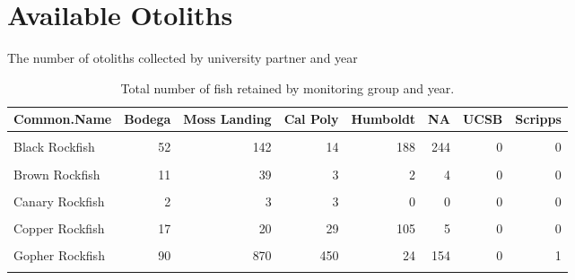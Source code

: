 \documentclass[
]{article}
\begin{document}
\hypertarget{available-otoliths}{%
\section{Available Otoliths}\label{available-otoliths}}

The number of otoliths collected by university partner and year

\FloatBarrier

\begin{table}

\caption{\label{tab:otoliths}Total number of fish retained by monitoring group and year.}
\centering
\begin{tabular}[t]{lrrrrrrr}
\toprule
Common.Name & Bodega & Moss Landing & Cal Poly & Humboldt & NA & UCSB & Scripps\\
\midrule
\cellcolor{gray!6}{Black-and-Yellow Rockfish} & \cellcolor{gray!6}{4} & \cellcolor{gray!6}{6} & \cellcolor{gray!6}{15} & \cellcolor{gray!6}{0} & \cellcolor{gray!6}{0} & \cellcolor{gray!6}{0} & \cellcolor{gray!6}{0}\\
Black Rockfish & 52 & 142 & 14 & 188 & 244 & 0 & 0\\
\cellcolor{gray!6}{Blue Rockfish} & \cellcolor{gray!6}{54} & \cellcolor{gray!6}{316} & \cellcolor{gray!6}{183} & \cellcolor{gray!6}{161} & \cellcolor{gray!6}{69} & \cellcolor{gray!6}{1} & \cellcolor{gray!6}{0}\\
Brown Rockfish & 11 & 39 & 3 & 2 & 4 & 0 & 0\\
\cellcolor{gray!6}{California Scorpionfish} & \cellcolor{gray!6}{0} & \cellcolor{gray!6}{0} & \cellcolor{gray!6}{0} & \cellcolor{gray!6}{0} & \cellcolor{gray!6}{0} & \cellcolor{gray!6}{0} & \cellcolor{gray!6}{1}\\
\addlinespace
Canary Rockfish & 2 & 3 & 3 & 0 & 0 & 0 & 0\\
\cellcolor{gray!6}{China Rockfish} & \cellcolor{gray!6}{48} & \cellcolor{gray!6}{38} & \cellcolor{gray!6}{3} & \cellcolor{gray!6}{70} & \cellcolor{gray!6}{31} & \cellcolor{gray!6}{0} & \cellcolor{gray!6}{0}\\
Copper Rockfish & 17 & 20 & 29 & 105 & 5 & 0 & 0\\
\cellcolor{gray!6}{Deacon Rockfish} & \cellcolor{gray!6}{59} & \cellcolor{gray!6}{64} & \cellcolor{gray!6}{2} & \cellcolor{gray!6}{133} & \cellcolor{gray!6}{58} & \cellcolor{gray!6}{0} & \cellcolor{gray!6}{0}\\
Gopher Rockfish & 90 & 870 & 450 & 24 & 154 & 0 & 1\\
\addlinespace
\cellcolor{gray!6}{Honeycomb Rockfish} & \cellcolor{gray!6}{0} & \cellcolor{gray!6}{0} & \cellcolor{gray!6}{0} & \cellcolor{gray!6}{0} & \cellcolor{gray!6}{0} & \cellcolor{gray!6}{0} & \cellcolor{gray!6}{1}\\

\end{tabular}
\end{table}
\end{document}
